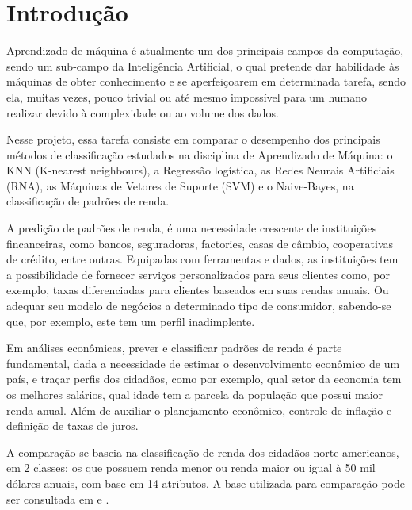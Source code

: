 \section{Introdução}
Aprendizado de máquina é atualmente um dos principais campos da computação, sendo um sub-campo da Inteligência Artificial, o qual pretende dar habilidade às máquinas de obter conhecimento e se aperfeiçoarem em determinada tarefa, sendo ela, muitas vezes, pouco trivial ou até mesmo impossível para um humano realizar devido à complexidade ou ao volume dos dados.

Nesse projeto, essa tarefa consiste em comparar o desempenho dos principais métodos de classificação estudados na disciplina de Aprendizado de Máquina: o KNN (K-nearest neighbours), a Regressão logística, as Redes Neurais Artificiais (RNA), as Máquinas de Vetores de Suporte (SVM) e o Naive-Bayes, na classificação de padrões de renda. \cite{trabalho}

A predição de padrões de renda, é uma necessidade crescente de instituições fincanceiras, como bancos, seguradoras, factories, casas de câmbio, cooperativas de crédito, entre outras. Equipadas com ferramentas e dados, as instituições tem a possibilidade de fornecer serviços personalizados para seus clientes como, por exemplo, taxas diferenciadas para clientes baseados em suas rendas anuais. Ou adequar seu modelo de negócios a determinado tipo de consumidor, sabendo-se que, por exemplo, este tem um perfil inadimplente.\cite{importance}

Em análises econômicas, prever e classificar padrões de renda é parte fundamental, dada a necessidade de estimar o desenvolvimento econômico de um país, e traçar perfis dos cidadãos, como por exemplo, qual setor da economia tem os melhores salários, qual idade tem a parcela da população que possui maior renda anual. Além de auxiliar o planejamento econômico, controle de inflação e definição de taxas de juros.\cite{importance2}

A comparação se baseia na classificação de renda dos cidadãos norte-americanos, em 2 classes: os que possuem renda menor ou renda maior ou igual à 50 mil dólares anuais, com base em 14 atributos. A base utilizada para comparação pode ser consultada em \cite{base} e \cite{base2}.
